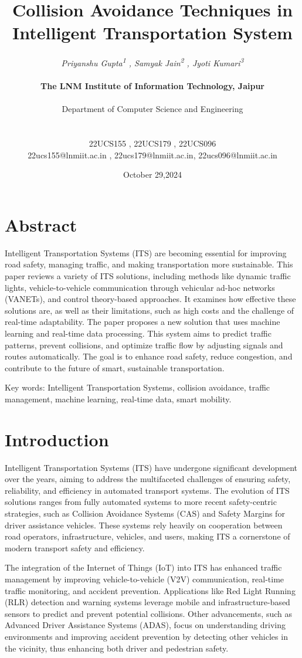 \documentclass[12pt,twocolumn]{article}
\title{\textbf{\Huge Collision Avoidance Techniques in Intelligent Transportation System}\\[1\baselineskip]}
\author{\textit{Priyanshu Gupta\textsuperscript{1} , Samyak Jain\textsuperscript{2} , Jyoti Kumari\textsuperscript{3}}\\[1\baselineskip] \\ \textbf{ The LNM Institute of Information Technology, Jaipur}\\ \\
Department of Computer Science and Engineering \\ \\ \\22UCS155 , 22UCS179 , 22UCS096\\ \vspace{1cm}22ucs155@lnmiit.ac.in , 22ucs179@lnmiit.ac.in, 22ucs096@lnmiit.ac.in
}
\date{\vspace{4cm}October 29,2024}
\begin{document}
\maketitle
\clearpage
\onecolumn
\tableofcontents
\twocolumn
\clearpage

\section{Abstract}
Intelligent Transportation Systems (ITS) are becoming essential for improving road safety, managing traffic, and making transportation more sustainable. This paper reviews a variety of ITS solutions, including methods like dynamic traffic lights, vehicle-to-vehicle communication through vehicular ad-hoc networks (VANETs), and control theory-based approaches. It examines how effective these solutions are, as well as their limitations, such as high costs and the challenge of real-time adaptability.
The paper proposes a new solution that uses machine learning and real-time data processing. This system aims to predict traffic patterns, prevent collisions, and optimize traffic flow by adjusting signals and routes automatically. The goal is to enhance road safety, reduce congestion, and contribute to the future of smart, sustainable transportation.

Key words: Intelligent Transportation Systems, collision avoidance, traffic management, machine learning, real-time data, smart mobility.
\section{Introduction}
Intelligent Transportation Systems (ITS) have undergone significant development over the years, aiming to address the multifaceted challenges of ensuring safety, reliability, and efficiency in automated transport systems. The evolution of ITS solutions ranges from fully automated systems to more recent safety-centric strategies, such as Collision Avoidance Systems (CAS) and Safety Margins for driver assistance vehicles. These systems rely heavily on cooperation between road operators, infrastructure, vehicles, and users, making ITS a cornerstone of modern transport safety and efficiency. 

The integration of the Internet of Things (IoT) into ITS has enhanced traffic management by improving vehicle-to-vehicle (V2V) communication, real-time traffic monitoring, and accident prevention. Applications like Red Light Running (RLR) detection and warning systems leverage mobile and infrastructure-based sensors to predict and prevent potential collisions. Other advancements, such as Advanced Driver Assistance Systems (ADAS), focus on understanding driving environments and improving accident prevention by detecting other vehicles in the vicinity, thus enhancing both driver and pedestrian safety.
\end{document}
